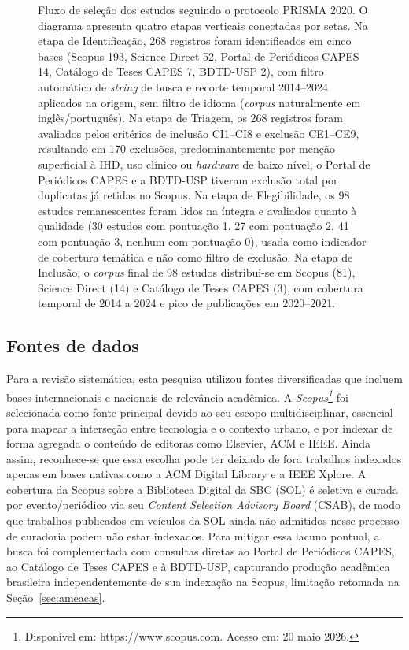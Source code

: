 \documentclass[12pt]{article}
\begin{document}
\begin{figure}[H]
{\begin{tikzpicture}
    \end{tikzpicture}}
    \caption{Fluxo de seleção dos estudos seguindo o protocolo PRISMA 2020. O diagrama apresenta quatro etapas verticais conectadas por setas. Na etapa de Identificação, 268 registros foram identificados em cinco bases (Scopus 193, Science Direct 52, Portal de Periódicos CAPES 14, Catálogo de Teses CAPES 7, BDTD-USP 2), com filtro automático de \textit{string} de busca e recorte temporal 2014--2024 aplicados na origem, sem filtro de idioma (\textit{corpus} naturalmente em inglês/português). Na etapa de Triagem, os 268 registros foram avaliados pelos critérios de inclusão CI1--CI8 e exclusão CE1--CE9, resultando em 170 exclusões, predominantemente por menção superficial à IHD, uso clínico ou \textit{hardware} de baixo nível; o Portal de Periódicos CAPES e a BDTD-USP tiveram exclusão total por duplicatas já retidas no Scopus. Na etapa de Elegibilidade, os 98 estudos remanescentes foram lidos na íntegra e avaliados quanto à qualidade (30 estudos com pontuação 1, 27 com pontuação 2, 41 com pontuação 3, nenhum com pontuação 0), usada como indicador de cobertura temática e não como filtro de exclusão. Na etapa de Inclusão, o \textit{corpus} final de 98 estudos distribui-se em Scopus (81), Science Direct (14) e Catálogo de Teses CAPES (3), com cobertura temporal de 2014 a 2024 e pico de publicações em 2020--2021.}
    \label{fig:prisma_flow}
\end{figure}

\subsection{Fontes de dados}

    Para a revisão sistemática, esta pesquisa utilizou fontes diversificadas que incluem bases internacionais e nacionais de relevância acadêmica. A \emph{Scopus\footnote{Disponível em: https://www.scopus.com. Acesso em: 20 maio 2026.}} foi selecionada como fonte principal devido ao seu escopo multidisciplinar, essencial para mapear a interseção entre tecnologia e o contexto urbano, e por indexar de forma agregada o conteúdo de editoras como Elsevier, ACM e IEEE. Ainda assim, reconhece-se que essa escolha pode ter deixado de fora trabalhos indexados apenas em bases nativas como a ACM Digital Library e a IEEE Xplore. A cobertura da Scopus sobre a Biblioteca Digital da SBC (SOL) é seletiva e curada por evento/periódico via seu \textit{Content Selection Advisory Board} (CSAB), de modo que trabalhos publicados em veículos da SOL ainda não admitidos nesse processo de curadoria podem não estar indexados. Para mitigar essa lacuna pontual, a busca foi complementada com consultas diretas ao Portal de Periódicos CAPES, ao Catálogo de Teses CAPES e à BDTD-USP, capturando produção acadêmica brasileira independentemente de sua indexação na Scopus, limitação retomada na Seção~\ref{sec:ameacas}.
\end{document}
